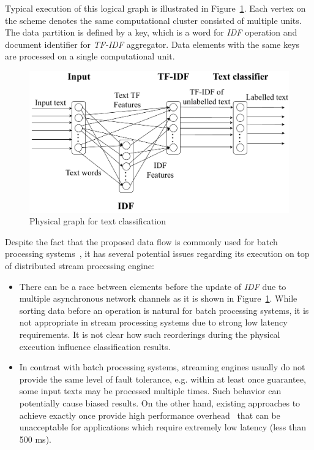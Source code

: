 Typical execution of this logical graph is illustrated in Figure~\ref{physical_graph}. Each vertex on the scheme denotes the same computational cluster consisted of multiple units. The data partition is defined by a key, which is a word for {\em IDF} operation and document identifier for {\em TF-IDF} aggregator. Data elements with the same keys are processed on a single computational unit.

\begin{figure}[htbp]
  \centering
  \includegraphics[scale=0.33]{pics/physical-graph-no-part-fit}
  \caption{Physical graph for text classification}
  \label {physical_graph}
\end{figure}

Despite the fact that the proposed data flow is commonly used for batch processing systems~\cite{semberecki2016distributed}, it has several potential issues regarding its execution on top of distributed stream processing engine:

\begin{itemize}
    \item There can be a race between elements before the update of {\em IDF} due to multiple asynchronous network channels as it is shown in Figure~\ref{physical_graph}. 
     While sorting data before an operation is natural for batch processing systems, it is not appropriate in stream processing systems due to strong low latency requirements. It is not clear how such reorderings during the physical execution influence classification results.
    \item In contrast with batch processing systems, streaming engines usually do not provide the same level of fault tolerance, e.g. within at least once guarantee, some input texts may be processed multiple times. Such behavior can potentially cause biased results. On the other hand, existing approaches to achieve exactly once provide high performance overhead~\cite{we2018beyondmr} that can be unacceptable for applications which require extremely low latency (less than 500 ms).
\end{itemize}